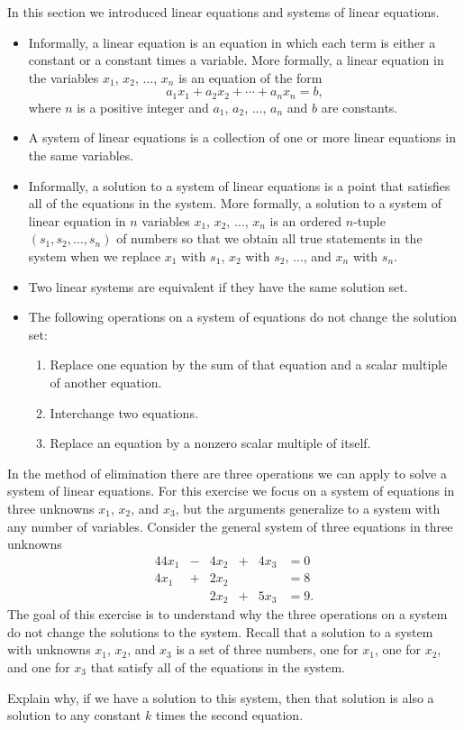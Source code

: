 \label{sec:intro_le_summ}
In this section we introduced linear equations and systems of linear equations. 
\begin{itemize}
\item Informally, a linear equation is an equation in which each term is either a constant or a constant times a variable. More formally, a linear equation in the variables $x_1$, $x_2$, $\ldots$, $x_n$ is an equation of the form
\[a_1x_1 + a_2x_2 + \cdots + a_nx_n = b,\]
where $n$ is a positive integer and $a_1$, $a_2$, $\ldots$, $a_n$ and $b$ are constants.
\item A system of linear equations is a collection of one or more linear equations in the same variables.
\item Informally, a solution to a system of linear equations is a point that satisfies all of the equations in the system. More formally, a solution to a system of linear equation in $n$ variables $x_1$, $x_2$, $\ldots$, $x_n$ is an ordered $n$-tuple $(s_1, s_2, \ldots, s_n)$ of numbers so that we obtain all true statements in the system when we replace $x_1$ with $s_1$, $x_2$ with $s_2$, $\ldots$, and $x_n$ with $s_n$.
\item Two linear systems are equivalent if they have the same solution set. 
\item The following operations on a system of equations do not change the solution set: 
\begin{enumerate}
\item Replace one equation by the sum of that equation and a scalar multiple of another equation.
\item Interchange two equations.
\item Replace an equation by a nonzero scalar multiple of itself.
\end{enumerate}
\end{itemize}




\label{sec:intro_le_exer}
\be

\item In the method of elimination there are three operations we can apply to solve a system of linear equations. For this exercise we focus on a system of equations in three unknowns $x_1$, $x_2$, and $x_3$, but the arguments generalize to a system with any number of variables. Consider the general system of three equations in three unknowns
\begin{alignat*}{4}
4x_1 	&{}-{}	&4x_2	&{}+{}	&4x_3 	&= 0  \\ 
4x_1 	&{}+{}	&2x_2	&{}		&{} 		&= 8  \\
{} 	&{}		&2x_2	&{}+{}	&5x_3	&= 9.  
\end{alignat*}
The goal of this exercise is to understand why the three operations on a system do not change the solutions to the system. Recall that a solution to a system with unknowns $x_1$, $x_2$, and $x_3$ is a set of three numbers, one for $x_1$, one for $x_2$, and one for $x_3$ that satisfy all of the equations in the system. 
	\ba
	\item Explain why, if we have a solution to this system, then that solution is also a solution to any constant $k$ times the second equation.  

